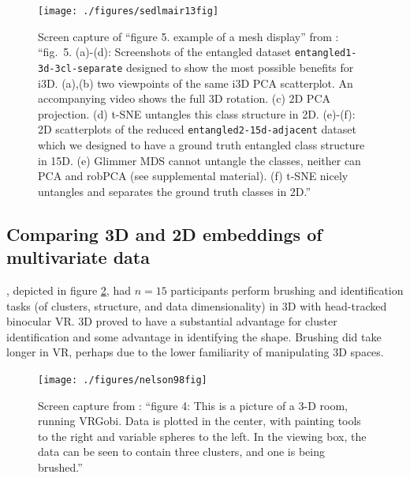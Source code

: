 \documentclass{template/monashthesis}
\begin{document}
\begin{figure}

{\centering \texttt{[image: ./figures/sedlmair13fig]} 

}

\caption{Screen capture of ``figure 5. example of a mesh display'' from \textcite{sedlmair_empirical_2013}: ``fig.~5. (a)-(d): Screenshots of the entangled dataset \texttt{entangled1-3d-3cl-separate} designed to show the most possible benefits for i3D. (a),(b) two viewpoints of the same i3D PCA scatterplot. An accompanying video shows the full 3D rotation. (c) 2D PCA projection. (d) t-SNE untangles this class structure in 2D. (e)-(f): 2D scatterplots of the reduced \texttt{entangled2-15d-adjacent} dataset which we designed to have a ground truth entangled class structure in 15D. (e) Glimmer MDS cannot untangle the classes, neither can PCA and robPCA (see supplemental material). (f) t-SNE nicely untangles and separates the ground truth classes in 2D.''}\label{fig:sedlmair13fig}
\end{figure}

\hypertarget{comparing-3d-and-2d-embeddings-of-multivariate-data}{%
\subsection{Comparing 3D and 2D embeddings of multivariate data}\label{comparing-3d-and-2d-embeddings-of-multivariate-data}}

\textcite{nelson_xgobi_1998}, depicted in figure \ref{fig:nelson98fig}, had \(n=15\) participants perform brushing and identification tasks (of clusters, structure, and data dimensionality) in 3D with head-tracked binocular VR. 3D proved to have a substantial advantage for cluster identification and some advantage in identifying the shape. Brushing did take longer in VR, perhaps due to the lower familiarity of manipulating 3D spaces.



\begin{figure}

{\centering \texttt{[image: ./figures/nelson98fig]} 

}

\caption{Screen capture from \textcite{nelson_xgobi_1998}: ``figure 4: This is a picture of a 3-D room, running VRGobi. Data is plotted in the center, with painting tools to the right and variable spheres to the left. In the viewing box, the data can be seen to contain three clusters, and one is being brushed.''}\label{fig:nelson98fig}
\end{figure}
\end{document}

